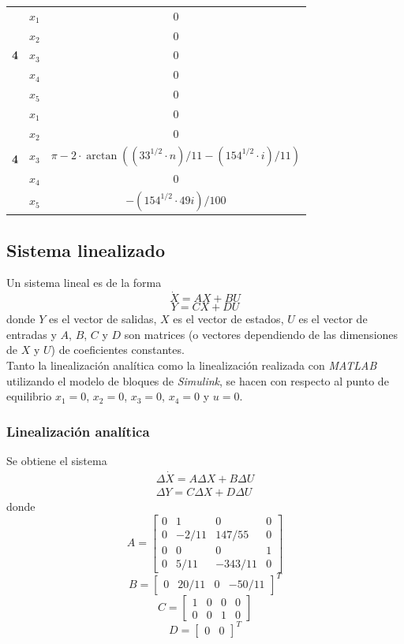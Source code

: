 \documentclass{ieeeaccess}
\begin{document}
\begin{table}[h!]
\begin{tabular}{|c|c|c|}
\multirow{5}{*}{\textbf{4}} & $x_1$ & 0\\
							& $x_2$ & 0\\
                            & $x_3$ & 0\\
                            & $x_4$ & 0\\
                            & $x_5$ & 0\\\hline
                            
\multirow{5}{*}{\textbf{4}} & $x_1$ & 0\\
							& $x_2$ & 0\\
                            & $x_3$ & $\pi - 2\cdot\arctan((33^{1/2}\cdot n)/11 - (154^{1/2}\cdot i)/11)$\\
                            & $x_4$ & 0\\
                            & $x_5$ & $-(154^{1/2}\cdot 49i)/100$\\\hline
\end{tabular}
\end{table}

\subsection{Sistema linealizado}
Un sistema lineal es de la forma
$$\dot{X}=AX+BU$$
$$Y=CX+DU$$
donde $Y$ es el vector de salidas, $X$ es el vector de estados, $U$ es el vector de entradas y $A$, $B$, $C$ y $D$ son matrices (o vectores dependiendo de las dimensiones de $X$ y $U$) de coeficientes constantes.\\

Tanto la linealización analítica como la linealización realizada con \textit{MATLAB} utilizando el modelo de bloques de \textit{Simulink}, se hacen con respecto al punto de equilibrio $x_1=0$, $x_2=0$, $x_3=0$, $x_4=0$ y $u=0$.

\subsubsection{Linealización analítica}

Se obtiene el sistema
\begin{eqnarray}
\Delta\dot{X} = A\Delta X + B\Delta U\\
\Delta Y = C\Delta X + D\Delta U
\end{eqnarray}
donde
$$A = \begin{bmatrix}
    0 & 1 & 0 & 0\\
    0 & -2/11 & 147/55 & 0\\
    0 & 0 & 0 & 1\\
    0 & 5/11 & -343/11 & 0
\end{bmatrix}$$
$$B = \begin{bmatrix}
    0 &
    20/11 &
    0 &
    -50/11
\end{bmatrix}^{T}$$
$$C = \begin{bmatrix}
    1 & 0 & 0 & 0\\
    0 & 0 & 1 & 0
\end{bmatrix}$$
$$D = \begin{bmatrix}
    0&
    0
\end{bmatrix}^{T}$$
\end{document}
